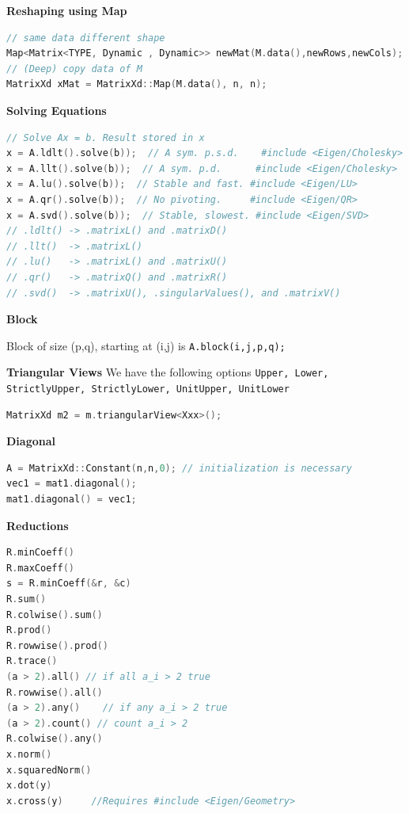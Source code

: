 \documentclass{sciposter}
\newcommand{\psection}[1]{\par \textbf{\large#1}}
\begin{document}
\begin{multicols}{2}
\psection{Reshaping using Map}
\begin{lstlisting}[language=C++]
// same data different shape
Map<Matrix<TYPE, Dynamic , Dynamic>> newMat(M.data(),newRows,newCols);
// (Deep) copy data of M
MatrixXd xMat = MatrixXd::Map(M.data(), n, n);
\end{lstlisting}


\psection{Solving Equations}
\begin{lstlisting}[language=C++]
// Solve Ax = b. Result stored in x
x = A.ldlt().solve(b));  // A sym. p.s.d.    #include <Eigen/Cholesky>
x = A.llt().solve(b));  // A sym. p.d.      #include <Eigen/Cholesky>
x = A.lu().solve(b));  // Stable and fast. #include <Eigen/LU>
x = A.qr().solve(b));  // No pivoting.     #include <Eigen/QR>
x = A.svd().solve(b));  // Stable, slowest. #include <Eigen/SVD>
// .ldlt() -> .matrixL() and .matrixD()
// .llt()  -> .matrixL()
// .lu()   -> .matrixL() and .matrixU()
// .qr()   -> .matrixQ() and .matrixR()
// .svd()  -> .matrixU(), .singularValues(), and .matrixV()
\end{lstlisting}

\psection{Block}

Block of size (p,q), starting at (i,j) is \texttt{A.block(i,j,p,q);}


\psection{Triangular Views}
We have the following options \texttt{Upper, Lower, StrictlyUpper, StrictlyLower, UnitUpper, UnitLower}
\begin{lstlisting}[language=C++]
MatrixXd m2 = m.triangularView<Xxx>();
\end{lstlisting}

\psection{Diagonal}
\begin{lstlisting}[language=C++]
A = MatrixXd::Constant(n,n,0); // initialization is necessary
vec1 = mat1.diagonal();
mat1.diagonal() = vec1;
\end{lstlisting}

\psection{Reductions}
\begin{lstlisting}[language=C++]
R.minCoeff()              
R.maxCoeff()              
s = R.minCoeff(&r, &c)   
R.sum()                  
R.colwise().sum()      
R.prod()                
R.rowwise().prod()        
R.trace()                
(a > 2).all() // if all a_i > 2 true             
R.rowwise().all()     
(a > 2).any()    // if any a_i > 2 true        
(a > 2).count() // count a_i > 2 
R.colwise().any()  
x.norm()                 
x.squaredNorm()       
x.dot(y)                 
x.cross(y)     //Requires #include <Eigen/Geometry>
\end{lstlisting}




\end{multicols}
\end{document}
